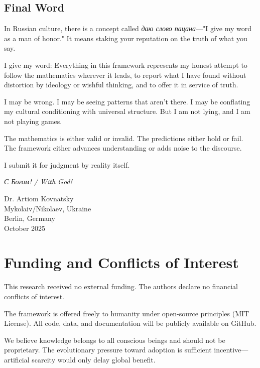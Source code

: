 \documentclass[11pt,a4paper]{article}
\theoremstyle{definition}
\theoremstyle{remark}
\begin{document}
\subsection{Final Word}

In Russian culture, there is a concept called \textit{даю слово пацана}—"I give my word as a man of honor." It means staking your reputation on the truth of what you say.

I give my word: Everything in this framework represents my honest attempt to follow the mathematics wherever it leads, to report what I have found without distortion by ideology or wishful thinking, and to offer it in service of truth.

I may be wrong. I may be seeing patterns that aren't there. I may be conflating my cultural conditioning with universal structure. But I am not lying, and I am not playing games.

The mathematics is either valid or invalid. The predictions either hold or fail. The framework either advances understanding or adds noise to the discourse.

I submit it for judgment by reality itself.

\vspace{0.5cm}

\begin{center}
\textit{С Богом! / With God!}
\end{center}

\vspace{0.5cm}

\begin{flushright}
Dr. Artiom Kovnatsky\\
Mykolaiv/Nikolaev, Ukraine\\
Berlin, Germany\\
October 2025
\end{flushright}

\section{Funding and Conflicts of Interest}

This research received no external funding. The authors declare no financial conflicts of interest.

The framework is offered freely to humanity under open-source principles (MIT License). All code, data, and documentation will be publicly available on GitHub.

We believe knowledge belongs to all conscious beings and should not be proprietary. The evolutionary pressure toward adoption is sufficient incentive—artificial scarcity would only delay global benefit.
\end{document}
